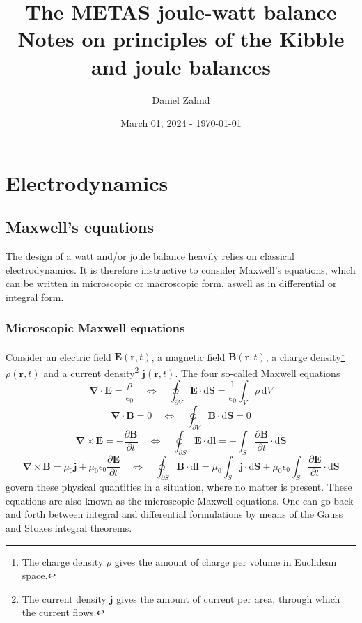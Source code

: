 \documentclass{report}
\title{\Huge The METAS joule-watt balance \\ \vspace{1cm} \large Notes on principles of the Kibble and joule balances}
\author{Daniel Zahnd}
\date{March 01, 2024 - \today}
\numberwithin{tm}{section}
\newcommand\vect[1]{\ensuremath{\bm{#1}}}
\begin{document}
	
\maketitle
\newpage
{}
\tableofcontents
\FloatBarrier
\newpage
{}
\setcounter{page}{1}
	
	\chapter{Electrodynamics}
	\section{Maxwell's equations}
	The design of a watt and/or joule balance heavily relies on classical electrodynamics. It is therefore instructive to consider Maxwell's equations, which can be written in microscopic or macroscopic form, aswell as in differential or integral form.
	\subsection{Microscopic Maxwell equations}
	Consider an electric field $\vect{E}(\vect{r},t)$, a magnetic field $\vect{B}(\vect{r},t)$, a charge density\footnote{The charge density $\rho$ gives the amount of charge per volume in Euclidean space.} $\rho(\vect{r},t)$ and a current density\footnote{The current density $\vect{j}$ gives the amount of current per area, through which the current flows.} $\vect{j}(\vect{r},t)$. The four so-called Maxwell equations \begin{equation}
	\vect{\nabla}\cdot \vect{E} = \frac{\rho}{\epsilon_0} \quad \Leftrightarrow \quad \oint_{\partial V} \vect{E}\cdot \mathrm{d}\vect{S} = \frac{1}{\epsilon_0}\int_{V}\rho\,\mathrm{d}V
	\end{equation}
	\begin{equation}
	\vect{\nabla}\cdot \vect{B} = 0 \quad \Leftrightarrow \quad \oint_{\partial V}\vect{B}\cdot \mathrm{d}\vect{S} = 0
	\end{equation}
	\begin{equation}
	\vect{\nabla} \times \vect{E} = - \frac{\partial \vect{B}}{\partial t} \quad \Leftrightarrow \quad \oint_{\partial S}\vect{E}\cdot \mathrm{d}\vect{l} = -\int_{S}\frac{\partial \vect{B}}{\partial t}\cdot \mathrm{d}\vect{S}
	\end{equation}
	\begin{equation}
	\vect{\nabla} \times \vect{B} = \mu_0\vect{j} + \mu_0\epsilon_0\frac{\partial \vect{E}}{\partial t} \quad \Leftrightarrow \quad \oint_{\partial S}\vect{B}\cdot \mathrm{d}\vect{l} = \mu_0\int_{S}\vect{j}\cdot \mathrm{d}\vect{S} + \mu_0\epsilon_0\int_{S}\frac{\partial \vect{E}}{\partial t}\cdot \mathrm{d}\vect{S}
	\end{equation} govern these physical quantities in a situation, where no matter is present. These equations are also known as the microscopic Maxwell equations. One can go back and forth between integral and differential formulations by means of the Gauss and Stokes integral theorems.
	
\end{document}
